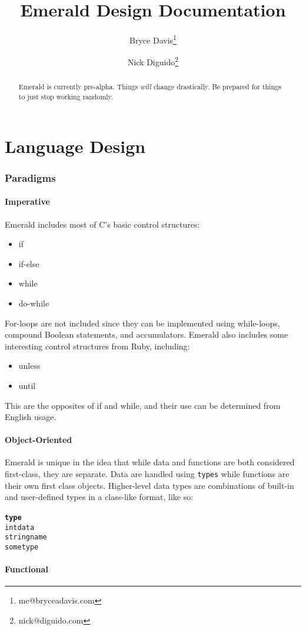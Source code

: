 \documentclass{article}
\title{Emerald Design Documentation}
\author[1]{Bryce Davis\thanks{me@bryceadavis.com}}
\author[1]{Nick Diguido\thanks{nick@diguido.com}}
\affil[1]{Datum Unlimited}
\begin{document}
    \maketitle
    \pagebreak

    \renewcommand{\abstractname}{Notes}
    \begin{abstract}
        Emerald is currently pre-alpha. Things \emph{will} change drastically.
        Be prepared for things to just stop working randomly.
    \end{abstract}
    \pagebreak

    \part{Language Design}
        \section{Paradigms}
            \subsection{Imperative}
                Emerald includes most of C's basic control structures:
                \begin{itemize}
                    \item if
                    \item if-else
                    \item while
                    \item do-while
                \end{itemize}
                For-loops are not included since they can be implemented using
                while-loops, compound Boolean statements, and accumulators.
                Emerald also includes some interesting control structures from
                Ruby, including:
                \begin{itemize}
                    \item unless
                    \item until
                \end{itemize}
                This are the opposites of if and while, and their use can be
                determined from English usage.
            \subsection{Object-Oriented}
                Emerald is unique in the idea that while data and functions are
                both considered first-class, they are separate. Data are handled
                using \texttt{types} while functions are their own first class
                objects. Higher-level data types are combinations of built-in
                and user-defined types in a class-like format, like so:
                \begin{alltt}
                    \textbf{type} {
                        int data
                        string name
                    } sometype
                \end{alltt}
            \subsection{Functional}
\end{document}
